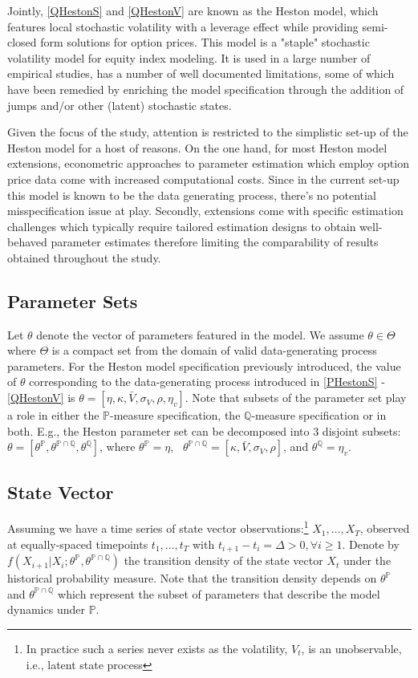 \documentclass[11pt,a4paper,notitlepage]{article}
\numberwithin{equation}{section}
\begin{document}
Jointly, \ref{QHestonS} and \ref{QHestonV} are known as the Heston model, which features local stochastic volatility with a leverage effect while providing semi-closed form solutions for option prices. This model is a "staple" stochastic volatility model for equity index modeling. It is used in a large number of empirical studies, has a number of well documented limitations, some of which have been remedied by enriching the model specification through the addition of jumps and/or other (latent) stochastic states. 

Given the focus of the study, attention is restricted to the simplistic set-up of the Heston model for a host of reasons. On the one hand, for most Heston model extensions, econometric approaches to parameter estimation which employ option price data come with increased computational costs. Since in the current set-up this model is known to be the data generating process, there's no potential misspecification issue at play.
Secondly, extensions come with specific estimation challenges which typically require tailored estimation designs to obtain well-behaved parameter estimates therefore limiting the comparability of results obtained throughout the study. 

\subsection{Parameter Sets}
Let $\theta$ denote the vector of parameters featured in the model. We assume $\theta \in \Theta$ where $\Theta$ is a compact set from the domain of valid data-generating process parameters. For the Heston model specification previously introduced, the value of $\theta$ corresponding to the data-generating process introduced in \eqref{PHestonS} - \eqref{QHestonV} is $\theta = \left[\eta, \kappa, \bar{V}, \sigma_V, \rho, \eta_v\right]$. Note that subsets of the parameter set play a role in either the $\mathbb{P}$-measure specification, the $\mathbb{Q}$-measure specification or in both. E.g., the Heston parameter set can be decomposed into 3 disjoint subsets: $\theta = \left[\theta^\mathbb{P}, \theta^{\mathbb{P}\cap\mathbb{Q}}, \theta^\mathbb{Q}\right]$, where $\theta^\mathbb{P} = \eta$,~ $\theta^{\mathbb{P}\cap\mathbb{Q}} = \left[\kappa, \bar{V}, \sigma_V, \rho\right]$, and $\theta^\mathbb{Q} = \eta_v$. 

\subsection{State Vector}
Assuming we have a time series of state vector observations:\footnote{In practice such a series never exists as the volatility, $V_t$, is an unobservable, i.e., latent state process} $X_1, \dots, X_T$, observed at  equally-spaced timepoints $t_1,\dots,t_T$ with $t_{i+1} - t_i = \Delta >0, \forall i\geq 1 $. Denote by $f(X_{i+1} |X_i; \theta^\mathbb{P},  \theta^{\mathbb{P} \cap \mathbb{Q}})$ the transition density of the state vector $X_t$ under the historical probability measure. Note that the transition density depends on $\theta^\mathbb{P}$ and $\theta^{\mathbb{P} \cap \mathbb{Q}}$ which represent the subset of parameters that describe the model dynamics under $\mathbb{P}$.
\end{document}
